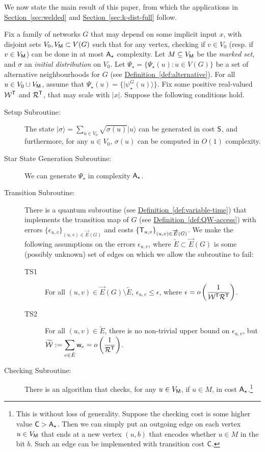 \documentclass{theoretics}
\renewcommand{\sec}[1]{\hyperref[sec:#1]{Section~\ref*{sec:#1}}}
\newcommand{\defin}[1]{\hyperref[def:#1]{Definition~\ref*{def:#1}}}
\def\ket#1{{\lvert}#1\rangle}
\renewcommand{\>}{\rangle}
\newcommand{\<}{\langle}
\renewcommand{\(}{\left(}
\renewcommand{\)}{\right)}
\def\w{{\sf w}}
\begin{document}
We now state the main result of this paper, from which the applications in \sec{welded} and \sec{k-dist-full} follow. 

\begin{theorem}\label{thm:full-framework}
Fix a family of networks $G$ that may depend on some implicit input $x$, with disjoint sets $V_0,V_{\sf M}\subset V(G)$ such that for any vertex, checking if $v\in V_0$ (resp. if $v\in V_{\sf M}$) can be done in at most ${\sf A}_\star$ complexity. Let $M\subseteq V_{\sf M}$ be the \emph{marked set}, and $\sigma$ an \emph{initial distribution} on $V_0$. Let $\Psi_\star=\{\Psi_\star(u):u\in V(G)\}$ be a set of alternative neighbourhoods for $G$ (see \defin{alternative}). 
For all $u\in V_0\cup V_{\sf M}$, assume that $\Psi_\star(u)=\{\ket{\psi_\star^G(u)}\}$. 
Fix some positive real-valued ${\cal W}^{\sf T}$ and ${\cal R}^{\sf T}$, that may scale with $|x|$.
Suppose the following conditions hold.
\begin{description}
\item[Setup Subroutine:] The state $\ket{\sigma}=\sum_{u\in V_0}\sqrt{\sigma(u)}\ket{u}$ can be generated in cost ${\sf S}$, and furthermore, for any $u\in V_0$, $\sigma(u)$ can be computed in $O(1)$ complexity. 
\item[Star State Generation Subroutine:] We can generate $\Psi_\star$ in complexity ${\sf A}_\star$.
\item[Transition Subroutine:] There is a quantum subroutine (see \defin{variable-time}) that implements the transition map of $G$ (see \defin{QW-access}) 
with errors $\{\epsilon_{u,v}\}_{(u,v)\in\overrightarrow{E}(G)}$ and costs $\{{\sf T}_{u,v}\}_{(u,v)\in\overrightarrow{E}(G)}$. We make the following assumptions on the errors $\epsilon_{u,v}$, where $\tilde{E}\subset\overrightarrow{E}(G)$ is some (possibly unknown) set of edges on which we allow the subroutine to fail:
	\begin{description}
	\item[TS1] For all $(u,v)\in\overrightarrow{E}(G)\setminus\tilde{E}$, $\epsilon_{u,v}\leq \epsilon$, where $\displaystyle\epsilon = o\left(\frac{1}{{\cal W}^{\sf T}{\cal R}^{\sf T}}\right)$. 
	\item[TS2] For all $(u,v)\in \tilde{E}$, there is no non-trivial upper bound on $\epsilon_{u,v}$, but $\displaystyle\widetilde{\cal W}:=\sum_{e\in \tilde{E}}\w_e=o\left(\frac{1}{{\cal R}^{\sf T}}\right)$. 
	\end{description}
\item[Checking Subroutine:] There is an algorithm that checks, for any $u\in V_{\sf M}$, if $u\in M$, in cost ${\sf A}_\star$.\footnote{This is without loss of generality. Suppose the checking cost is some higher value ${\sf C}>{\sf A}_\star$. Then we can simply put an outgoing edge on each vertex $u\in V_{\sf M}$ that ends at a new vertex $(u,b)$ that encodes whether $u\in M$ in the bit $b$. Such an edge can be implemented with transition cost ${\sf C}$.} 

\end{description}
\end{theorem}
\end{document}
